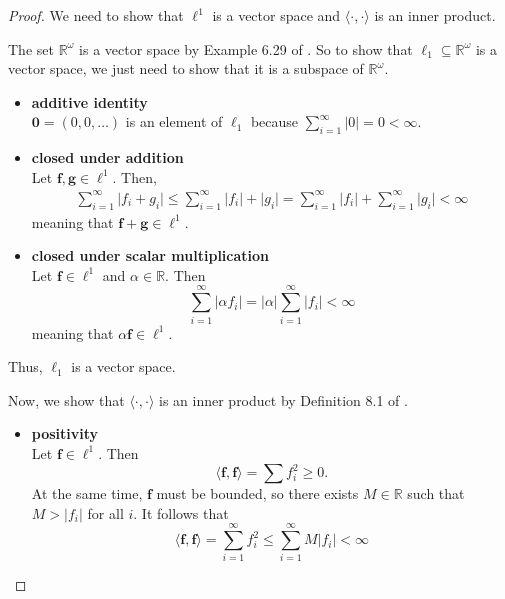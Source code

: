 \begin{proof}
    We need to show that $\ell^1$ is a vector space and $\langle \cdot, \cdot \rangle$ is an inner product.

    The set $\mathbb{R}^{\omega}$ is a vector space by Example 6.29 of \cite{axler2020}.
    So to show that $\ell_1 \subseteq \mathbb{R}^{\omega}$ is a vector space, we just need to show that it is a subspace of $\mathbb{R}^{\omega}$.
    \begin{itemize}
        \item \textbf{additive identity}\\
            $\mathbf{0} = (0, 0, \ldots)$ is an element of $\ell_1$ because
            $\sum\limits_{i=1}^{\infty} \lvert 0 \rvert = 0 < \infty$.
        \item \textbf{closed under addition} \\
            Let $\mathbf{f}, \mathbf{g} \in \ell^{1}$.
            Then,
            \begin{align*}
                \sum\limits_{i=1}^{\infty} \lvert f_i + g_i \rvert
                \leq \sum\limits_{i=1}^{\infty} \lvert f_i \rvert + \lvert g_i \rvert
                = \sum\limits_{i=1}^{\infty} \lvert f_i \rvert + \sum\limits_{i=1}^{\infty} \lvert g_i \rvert
                < \infty
            \end{align*}
            meaning that $\mathbf{f} + \mathbf{g} \in \ell^{1}$.
        \item \textbf{closed under scalar multiplication} \\
            Let $\mathbf{f} \in \ell^{1}$ and $\alpha \in \mathbb{R}$.
            Then
            \begin{equation*}
                \sum\limits_{i=1}^{\infty} \lvert \alpha f_i \rvert
                = \lvert \alpha \rvert \sum\limits_{i=1}^{\infty} \lvert f_i \rvert
                < \infty
            \end{equation*}
            meaning that $\alpha \mathbf{f} \in \ell^1$.
    \end{itemize}
    Thus, $\ell_1$ is a vector space.

    Now, we show that $\langle \cdot , \cdot \rangle$ is an inner product by Definition 8.1 of \cite{axler2020}.
    \begin{itemize}
        \item \textbf{positivity}\\
            Let $\mathbf{f} \in \ell^{1}$.
            Then
            \begin{equation*}
                \langle \mathbf{f}, \mathbf{f} \rangle
                = \sum f_i^2
                \geq 0.
            \end{equation*}
            At the same time, $\mathbf{f}$ must be bounded, so there exists $M \in \mathbb{R}$ such that $M > \lvert f_i \rvert$ for all $i$.
            It follows that
            \begin{equation*}
                \langle \mathbf{f}, \mathbf{f} \rangle
                = \sum\limits_{i=1}^{\infty} f_i^2
                \leq \sum\limits_{i=1}^{\infty}
                M \lvert f_i \rvert < \infty
            \end{equation*}


\end{itemize}
\end{proof}

